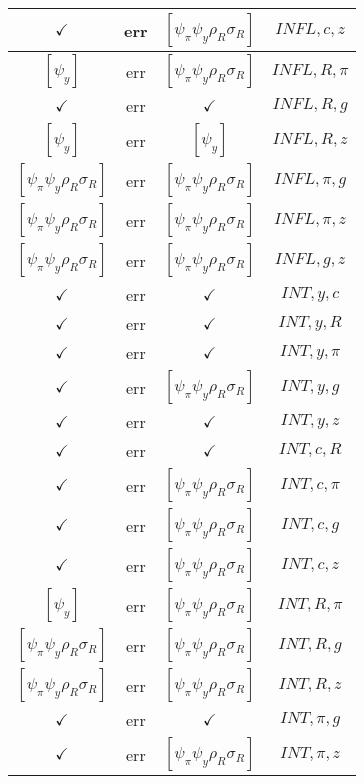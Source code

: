 \documentclass[a4paper,10pt]{article}
\begin{document}
\begin{longtable}{|c|c|c|c|}
\hline
$\checkmark$ & err & $[\psi_\pi \psi_y \rho_R \sigma_R ]$ & ${INFL},{c},{z}$ \\
\hline
$[\psi_y ]$ & err & $[\psi_\pi \psi_y \rho_R \sigma_R ]$ & ${INFL},{R},{\pi}$ \\
\hline
$\checkmark$ & err & $\checkmark$ & ${INFL},{R},{g}$ \\
\hline
$[\psi_y ]$ & err & $[\psi_y ]$ & ${INFL},{R},{z}$ \\
\hline
$[\psi_\pi \psi_y \rho_R \sigma_R ]$ & err & $[\psi_\pi \psi_y \rho_R \sigma_R ]$ & ${INFL},{\pi},{g}$ \\
\hline
$[\psi_\pi \psi_y \rho_R \sigma_R ]$ & err & $[\psi_\pi \psi_y \rho_R \sigma_R ]$ & ${INFL},{\pi},{z}$ \\
\hline
$[\psi_\pi \psi_y \rho_R \sigma_R ]$ & err & $[\psi_\pi \psi_y \rho_R \sigma_R ]$ & ${INFL},{g},{z}$ \\
\hline
$\checkmark$ & err & $\checkmark$ & ${INT},{y},{c}$ \\
\hline
$\checkmark$ & err & $\checkmark$ & ${INT},{y},{R}$ \\
\hline
$\checkmark$ & err & $\checkmark$ & ${INT},{y},{\pi}$ \\
\hline
$\checkmark$ & err & $[\psi_\pi \psi_y \rho_R \sigma_R ]$ & ${INT},{y},{g}$ \\
\hline
$\checkmark$ & err & $\checkmark$ & ${INT},{y},{z}$ \\
\hline
$\checkmark$ & err & $\checkmark$ & ${INT},{c},{R}$ \\
\hline
$\checkmark$ & err & $[\psi_\pi \psi_y \rho_R \sigma_R ]$ & ${INT},{c},{\pi}$ \\
\hline
$\checkmark$ & err & $[\psi_\pi \psi_y \rho_R \sigma_R ]$ & ${INT},{c},{g}$ \\
\hline
$\checkmark$ & err & $[\psi_\pi \psi_y \rho_R \sigma_R ]$ & ${INT},{c},{z}$ \\
\hline
$[\psi_y ]$ & err & $[\psi_\pi \psi_y \rho_R \sigma_R ]$ & ${INT},{R},{\pi}$ \\
\hline
$[\psi_\pi \psi_y \rho_R \sigma_R ]$ & err & $[\psi_\pi \psi_y \rho_R \sigma_R ]$ & ${INT},{R},{g}$ \\
\hline
$[\psi_\pi \psi_y \rho_R \sigma_R ]$ & err & $[\psi_\pi \psi_y \rho_R \sigma_R ]$ & ${INT},{R},{z}$ \\
\hline
$\checkmark$ & err & $\checkmark$ & ${INT},{\pi},{g}$ \\
\hline
$\checkmark$ & err & $[\psi_\pi \psi_y \rho_R \sigma_R ]$ & ${INT},{\pi},{z}$ \\
\hline

\end{longtable}
\end{document}
